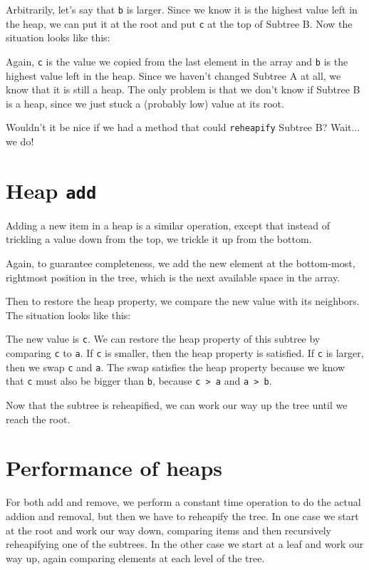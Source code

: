 Arbitrarily, let's say that {\tt b} is larger.  Since we
know it is the highest value left in the heap, we can put it
at the root and put {\tt c} at the top of Subtree B.  Now the
situation looks like this:
 

Again, {\tt c} is the value we copied from the
last element in the array and {\tt b} is the highest
value left in the heap.  Since we haven't changed Subtree A
at all, we know that it is still a heap.  The only problem is
that we don't know if Subtree B is a heap, since we just stuck
a (probably low) value at its root.


Wouldn't it be nice if we had a method that could {\tt reheapify}
Subtree B?  Wait... we do!


\section {Heap {\tt add}}

Adding a new item in a heap is a similar operation, except that
instead of trickling a value down from the top, we trickle it
up from the bottom.

Again, to guarantee completeness, we add the new element at the
bottom-most, rightmost position in the tree, which is the next
available space in the array.

Then to restore the heap property, we compare the new value with
its neighbors.  The situation looks like this:
 
 
The new value is {\tt c}.  We can restore the heap property
of this subtree by comparing {\tt c} to {\tt a}.  
If {\tt c} is smaller, then the heap property is satisfied.
If {\tt c} is larger, then we swap {\tt c} and {\tt a}.  The
swap satisfies the heap property because we know that {\tt c}
must also be bigger than {\tt b}, because {\tt c > a} and
{\tt a > b}.

Now that the subtree is reheapified, we can work our way up
the tree until we reach the root.


\section {Performance of heaps}

For both add and remove, we perform a constant time operation
to do the actual addion and removal, but then we have to
reheapify the tree.  In one case we start at the root and work
our way down, comparing items and then recursively reheapifying
one of the subtrees.  In the other case we start at a leaf and
work our way up, again comparing elements at each level of
the tree.

